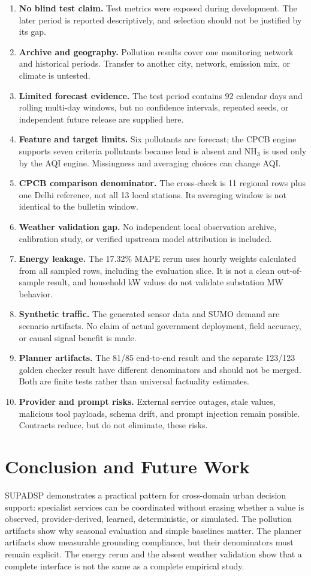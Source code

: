 \documentclass[conference]{IEEEtran}
\begin{document}
\begin{enumerate}
\item \textbf{No blind test claim.} Test metrics were exposed during development. The later period is reported descriptively, and selection should not be justified by its gap.
\item \textbf{Archive and geography.} Pollution results cover one monitoring network and historical periods. Transfer to another city, network, emission mix, or climate is untested.
\item \textbf{Limited forecast evidence.} The test period contains 92 calendar days and rolling multi-day windows, but no confidence intervals, repeated seeds, or independent future release are supplied here.
\item \textbf{Feature and target limits.} Six pollutants are forecast; the CPCB engine supports seven criteria pollutants because lead is absent and NH$_3$ is used only by the AQI engine. Missingness and averaging choices can change AQI.
\item \textbf{CPCB comparison denominator.} The cross-check is 11 regional rows plus one Delhi reference, not all 13 local stations. Its averaging window is not identical to the bulletin window.
\item \textbf{Weather validation gap.} No independent local observation archive, calibration study, or verified upstream model attribution is included.
\item \textbf{Energy leakage.} The 17.32\% MAPE rerun uses hourly weights calculated from all sampled rows, including the evaluation slice. It is not a clean out-of-sample result, and household kW values do not validate substation MW behavior.
\item \textbf{Synthetic traffic.} The generated sensor data and SUMO demand are scenario artifacts. No claim of actual government deployment, field accuracy, or causal signal benefit is made.
\item \textbf{Planner artifacts.} The 81/85 end-to-end result and the separate 123/123 golden checker result have different denominators and should not be merged. Both are finite tests rather than universal factuality estimates.
\item \textbf{Provider and prompt risks.} External service outages, stale values, malicious tool payloads, schema drift, and prompt injection remain possible. Contracts reduce, but do not eliminate, these risks.
\end{enumerate}

\section{Conclusion and Future Work}
SUPADSP demonstrates a practical pattern for cross-domain urban decision support: specialist services can be coordinated without erasing whether a value is observed, provider-derived, learned, deterministic, or simulated. The pollution artifacts show why seasonal evaluation and simple baselines matter. The planner artifacts show measurable grounding compliance, but their denominators must remain explicit. The energy rerun and the absent weather validation show that a complete interface is not the same as a complete empirical study.
\end{document}
